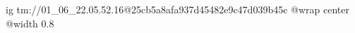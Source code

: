  
 
 
 
 

\qqSecOrig


\ifcmt
  ig tm://01_06_22.05.52.16@25cb5a8afa937d45482e9c47d039b45c
  @wrap center
  @width 0.8
\fi

